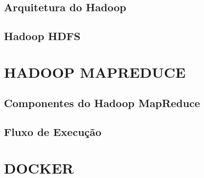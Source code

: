\subsection{Arquitetura do Hadoop}\label{ssec:arquiteturahadoop}
\subsection{Hadoop HDFS}\label{ssec:hadoophdfs}

\section{HADOOP MAPREDUCE} \label{sec:hadoopmapreduce}
\subsection{Componentes do Hadoop MapReduce}\label{ssec:componentehmp}
\subsection{Fluxo de Execução}\label{ssec:fluxoexecucaohmp}

\section{DOCKER} \label{sec:docker}
